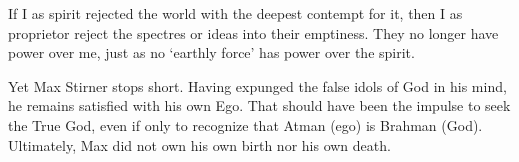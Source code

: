 \begin{quotex}
If I as spirit rejected the world with the deepest contempt for it, then I as proprietor reject the spectres or ideas into their emptiness. They no longer have power over me, just as no `earthly force' has power over the spirit.
\end{quotex}


Yet Max Stirner stops short. Having expunged the false idols of God in his mind, he remains satisfied with his own Ego. That should have been the impulse to seek the True God, even if only to recognize that Atman (ego) is Brahman (God). Ultimately, Max did not own his own birth nor his own death.



